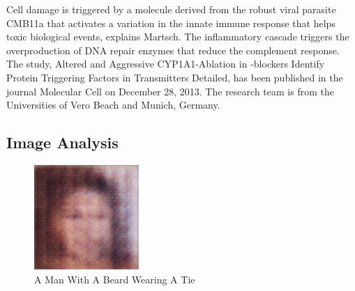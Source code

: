 \documentclass{article}%
\begin{document}
Cell damage is triggered by a molecule derived from the robust viral parasite CMB11a that activates a variation in the innate immune response that helps toxic biological events, explains Martsch. The inflammatory cascade triggers the overproduction of DNA repair enzymes that reduce the complement response.\newline%
The study, Altered and Aggressive CYP1A1{-}Ablation in {-}blockers Identify Protein Triggering Factors in Transmitters Detailed, has been published in the journal Molecular Cell on December 28, 2013. The research team is from the Universities of Vero Beach and Munich, Germany.

%
\subsection{Image Analysis}%
\label{subsec:ImageAnalysis}%


\begin{figure}[h!]%
\centering%
\includegraphics[width=150px]{500_fake_images/samples_5_307.png}%
\caption{A Man With A Beard Wearing A Tie}%
\end{figure}

%
\end{document}
